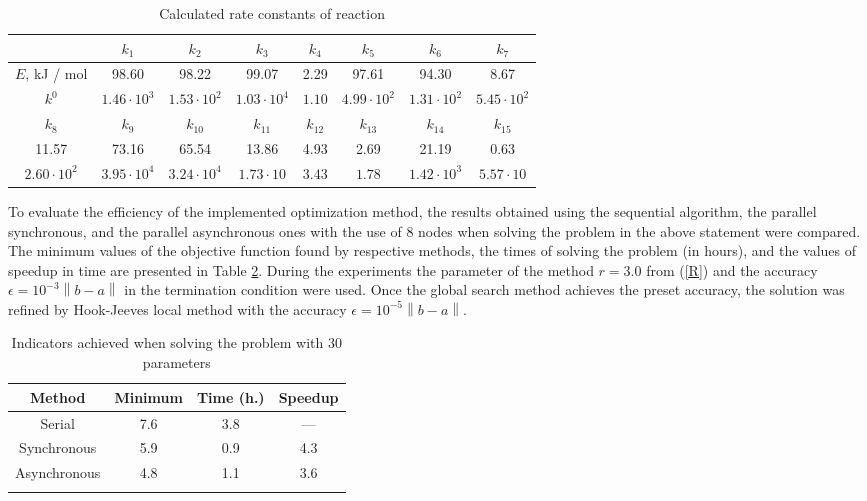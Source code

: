 \documentclass{svproc}
\begin{document}
\begin{table}
\caption{Calculated rate constants of reaction}
\label{table_res1}
\begin{center}
\begin{tabular}{cccccccc}
\hline
 & $k_1$ & $k_2$ & $k_3$ & $k_4$ & $k_5$ & $k_6$ & $k_7$\\
\hline\rule{0pt}{12pt}
$E$, kJ / mol & 98.60 & 98.22 & 99.07 & 2.29 & 97.61 & 94.30 & 8.67\\
$k^0$ & $1.46\cdot10^3$ & $1.53\cdot10^2$ & $1.03\cdot10^4$ & $1.10$ & $4.99\cdot10^2$  & $1.31\cdot10^2$ & $5.45\cdot10^2$\\
\hline
$k_8$ & $k_9$ & $k_{10}$ & $k_{11}$ & $k_{12}$ & $k_{13}$ & $k_{14}$ & $k_{15}$ \\
\hline\rule{0pt}{12pt}
11.57 & 73.16 & 65.54 & 13.86 & 4.93 & 2.69 & 21.19 & 0.63\\
$2.60\cdot10^2$ & $3.95\cdot10^4$ & $3.24\cdot10^4$ & $1.73\cdot10$ & $3.43$ & $1.78$ & $1.42\cdot10^3$ & $5.57\cdot10$\\[2pt]
\hline
\end{tabular}\end{center}\end{table}

To evaluate the efficiency of the implemented optimization method, the results obtained using the sequential algorithm, the parallel synchronous, and the parallel asynchronous ones with the use of 8 nodes when solving the problem in the above statement were compared.  
The minimum values of the objective function found by respective methods, the times of solving the problem (in hours), and the values of speedup in time are presented in Table \ref{table_30D}. 
During the experiments the parameter of the method $r=3.0$ from (\ref{R}) and the accuracy  $\epsilon = 10^{-3}\left\|b-a\right\|$ in the termination condition were used. Once the global search method achieves the preset accuracy, the solution was refined by Hook-Jeeves local method \cite{HookJeeves} with the accuracy $\epsilon = 10^{-5}\left\|b-a\right\|$.

\begin{table}
\caption{Indicators achieved when solving the problem with 30 parameters}
\label{table_30D}
\begin{center}
\begin{tabular}{cccc}
\hline\noalign{\smallskip}
 Method      & Minimum  & Time (h.) & Speedup \\
\hline\noalign{\smallskip}
Serial       & 7.6   &    3.8     &  ---        \\
Synchronous  & 5.9   &   0.9     &   4.3       \\
Asynchronous & 4.8   &   1.1     &   3.6       \\
\noalign{\smallskip}\hline
\end{tabular}\end{center}\end{table}
\end{document}
